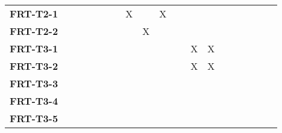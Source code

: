 \documentclass[12pt, titlepage]{article}
\begin{document}
\begin{landscape}
\begin{longtable}{|l|cccccccccccccccc|}
            \textbf{FRT-T2-1}  & ~                                                         & ~            & ~            & ~            & X            & ~            & X            & ~            & ~            & ~             \\
            \textbf{FRT-T2-2}  & ~                                                         & ~            & ~            & ~            & ~            & X            & ~            & ~            & ~            & ~             \\
            \textbf{FRT-T3-1}  & ~                                                         & ~            & ~            & ~            & ~            & ~            & ~            & ~            & X            & X             \\     
            \textbf{FRT-T3-2}  & ~                                                         & ~            & ~            & ~            & ~            & ~            & ~            & ~            & X            & X             \\     
            \textbf{FRT-T3-3}  & ~                                                         & ~            & ~            & ~            & ~            & ~            & ~            & ~            & ~            & ~             \\     
            \textbf{FRT-T3-4}  & ~                                                         & ~            & ~            & ~            & ~            & ~            & ~            & ~            & ~            & ~             \\     
            \textbf{FRT-T3-5}  & ~                                                         & ~            & ~            & ~            & ~            & ~            & ~            & ~            & ~            & ~             \\     
			\hline
		\end{longtable}


\end{landscape}
\end{document}
